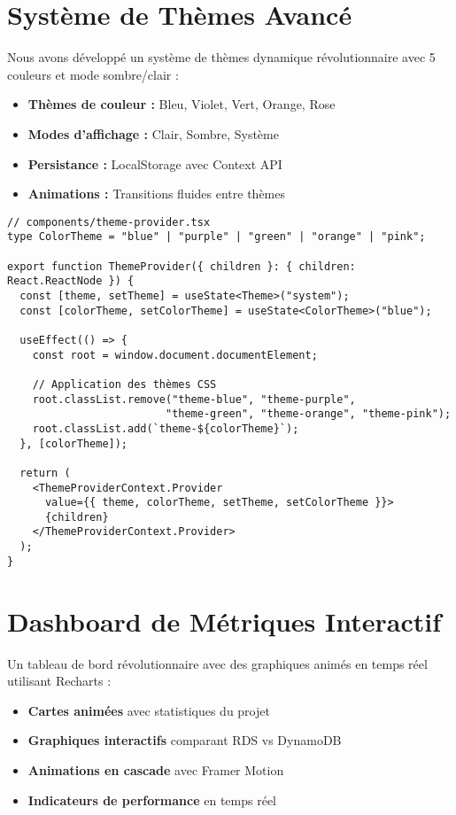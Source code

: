 \documentclass[12pt,a4paper]{report}
\begin{document}
\section{Système de Thèmes Avancé}

Nous avons développé un système de thèmes dynamique révolutionnaire avec 5 couleurs et mode sombre/clair :

\begin{itemize}
    \item \textbf{Thèmes de couleur :} Bleu, Violet, Vert, Orange, Rose
    \item \textbf{Modes d'affichage :} Clair, Sombre, Système
    \item \textbf{Persistance :} LocalStorage avec Context API
    \item \textbf{Animations :} Transitions fluides entre thèmes
\end{itemize}

\begin{lstlisting}[caption=Système de thèmes avec persistance]
// components/theme-provider.tsx
type ColorTheme = "blue" | "purple" | "green" | "orange" | "pink";

export function ThemeProvider({ children }: { children: React.ReactNode }) {
  const [theme, setTheme] = useState<Theme>("system");
  const [colorTheme, setColorTheme] = useState<ColorTheme>("blue");

  useEffect(() => {
    const root = window.document.documentElement;
    
    // Application des thèmes CSS
    root.classList.remove("theme-blue", "theme-purple", 
                         "theme-green", "theme-orange", "theme-pink");
    root.classList.add(`theme-${colorTheme}`);
  }, [colorTheme]);

  return (
    <ThemeProviderContext.Provider 
      value={{ theme, colorTheme, setTheme, setColorTheme }}>
      {children}
    </ThemeProviderContext.Provider>
  );
}
\end{lstlisting}

\section{Dashboard de Métriques Interactif}

Un tableau de bord révolutionnaire avec des graphiques animés en temps réel utilisant Recharts :

\begin{itemize}
    \item \textbf{Cartes animées} avec statistiques du projet
    \item \textbf{Graphiques interactifs} comparant RDS vs DynamoDB
    \item \textbf{Animations en cascade} avec Framer Motion
    \item \textbf{Indicateurs de performance} en temps réel
\end{itemize}
\end{document}
